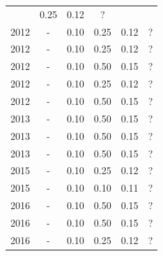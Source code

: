 \begin{table}[H]
\begin{tabular}{| l | c | c | c | c | c |}
          &
          0.25
          &
            {\color{red} 0.12}
          &
          ?
          \\
            2012
          &
          -
          &
          0.10
          &
          0.25
          &
            {\color{red} 0.12}
          &
          ?
          \\
            2012
          &
          -
          &
          0.10
          &
          0.25
          &
            {\color{red} 0.12}
          &
          ?
          \\
            2012
          &
          -
          &
          0.10
          &
          0.50
          &
            {\color{red} 0.15}
          &
          ?
          \\
            2012
          &
          -
          &
          0.10
          &
          0.25
          &
            {\color{red} 0.12}
          &
          ?
          \\
            2012
          &
          -
          &
          0.10
          &
          0.50
          &
            {\color{red} 0.15}
          &
          ?
          \\
\hline
            2013
          &
          -
          &
          0.10
          &
          0.50
          &
            {\color{red} 0.15}
          &
          ?
          \\
            2013
          &
          -
          &
          0.10
          &
          0.50
          &
            {\color{red} 0.15}
          &
          ?
          \\
            2013
          &
          -
          &
          0.10
          &
          0.50
          &
            {\color{red} 0.15}
          &
          ?
          \\
\hline
            2015
          &
          -
          &
          0.10
          &
          0.25
          &
            {\color{red} 0.12}
          &
          ?
          \\
            2015
          &
          -
          &
          0.10
          &
          0.10
          &
            {\color{red} 0.11}
          &
          ?
          \\
\hline
            2016
          &
          -
          &
          0.10
          &
          0.50
          &
            {\color{red} 0.15}
          &
          ?
          \\
            2016
          &
          -
          &
          0.10
          &
          0.50
          &
            {\color{red} 0.15}
          &
          ?
          \\
            2016
          &
          -
          &
          0.10
          &
          0.25
          &
            {\color{red} 0.12}
          &
          ?
          \\
\hline
\end{tabular}
\end{table}



